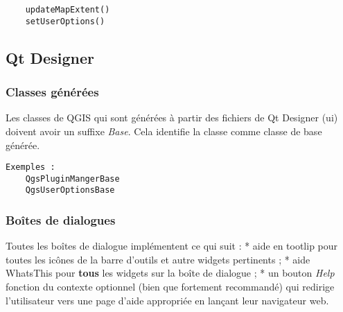 \begin{verbatim}
	updateMapExtent()
	setUserOptions()
\end{verbatim}

\subsection{Qt Designer}
\subsubsection{Classes générées}
Les classes de QGIS qui sont générées à partir des fichiers de Qt Designer (ui) doivent avoir un suffixe \textit{Base}. Cela identifie la classe comme classe de base générée.

\begin{verbatim}
Exemples :
	QgsPluginMangerBase
	QgsUserOptionsBase
\end{verbatim}
\subsubsection{Boîtes de dialogues}
Toutes les boîtes de dialogue implémentent ce qui suit :
 * aide en tootlip pour toutes les icônes de la barre d'outils et autre widgets pertinents ;
  * aide WhatsThis pour \textbf{tous} les widgets sur la boîte de dialogue ;
  * un bouton \textit{Help} fonction du contexte optionnel (bien que fortement recommandé) qui redirige l'utilisateur vers une page d'aide appropriée en lançant leur navigateur web.

